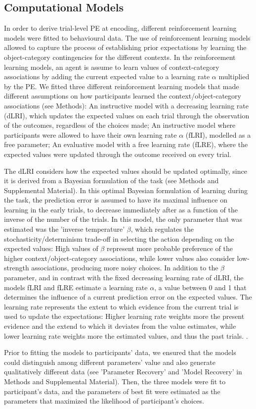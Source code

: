 \documentclass[a4paper,12pt]{article} 			%
\begin{document}
\subsection{Computational Models}
In order to derive trial-level PE at encoding, different reinforcement learning models \citep{Sutton2018a} were fitted to behavioural data. The use of reinforcement learning models allowed to capture the process of establishing prior expectations by learning the object-category contingencies for the different contexts. In the reinforcement learning models, an agent is assume to learn values of context-category associations by adding the current expected value to a learning rate $\alpha$ multiplied by the PE. We fitted three different reinforcement learning models that made different assumptions on how participants learned the context/object-category associations (see Methods): An instructive model with a decreasing learning rate (dLRI), which updates the expected values on each trial through the observation of the outcomes, regardless of the choices made; An instructive model where participants were allowed to have their own learning rate $\alpha$ (fLRI), modelled as a free parameter; An evaluative model with a free learning rate (fLRE), where the expected values were updated through the outcome received on every trial. \par
The dLRI considers how the expected values should be updated optimally, since it is derived from a Bayesian formulation of the task (see Methods and Supplemental Material). In this optimal Bayesian formulation of learning during the task, the prediction error is assumed to have its maximal influence on learning in the early trials, to decrease immediately after as a function of the inverse of the number of the trials. In this model, the only parameter that was estimated was the 'inverse temperature' $\beta$, which regulates the stochasticity/determinism trade-off in selecting the action depending on the expected values: High values of $\beta$ represent more probable preference of the higher context/object-category associations, while lower values also consider low-strength associations, producing more noisy choices.
In addition to the $\beta$ parameter, and in contrast with the fixed decreasing learning rate of dLRI, the models fLRI and fLRE estimate a learning rate $\alpha$, a value between 0 and 1 that determines the influence of a current prediction error on the expected values. The learning rate represents the extent to which evidence from the current trial is used to update the expectations: Higher learning rate weights more the present evidence and the extend to which it deviates from the value estimates, while lower learning rate weights more the estimated values, and thus the past trials. \citep{Sutton2018a}.  \par
Prior to fitting the models to participants' data, we ensured that the models could distinguish among different parameters' value and also generate qualitatively different data (see 'Parameter Recovery' and 'Model Recovery' in Methods and Supplemental Material). Then, the three models were fit to participant's data, and the parameters of best fit were estimated as the parameters that maximized the likelihood of participant's choices. 
\end{document}
